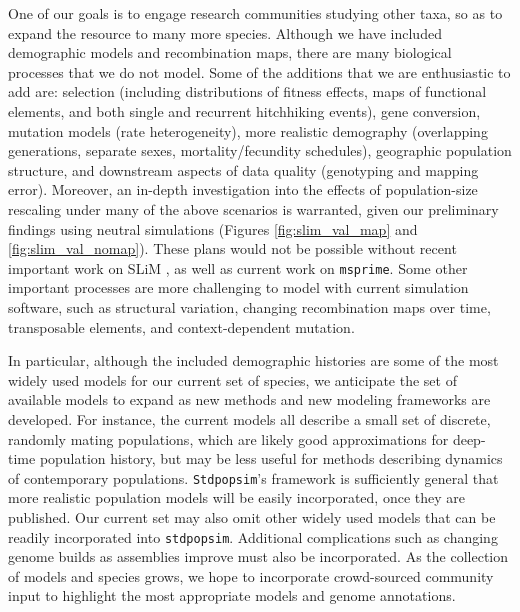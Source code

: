 \documentclass[12pt,halfline,a4paper]{ouparticle}
\newcommand{\Stdpopsim}{\texttt{Stdpopsim}\xspace}
\newcommand{\stdpopsim}{\texttt{stdpopsim}\xspace}
\begin{document}
One of our goals is to engage research communities studying other taxa,
so as to expand the resource to many more species.
Although we have included demographic models and recombination maps,
there are many biological processes that we do not model.
Some of the additions that we are enthusiastic to add are:
selection (including distributions of fitness effects, maps of functional elements, and both single and recurrent hitchhiking events),
gene conversion, mutation models (rate heterogeneity),
more realistic demography (overlapping generations, separate sexes, mortality/fecundity schedules),
geographic population structure,
and downstream aspects of data quality (genotyping and mapping error).
Moreover, an in-depth investigation into the effects of population-size rescaling under many of the
above scenarios is warranted, given our preliminary findings using neutral simulations
(Figures \ref{fig:slim_val_map} and \ref{fig:slim_val_nomap}).
These plans would not be possible without recent important work on SLiM \citep{haller2019slim},
as well as current work on \texttt{msprime}.
Some other important processes are more challenging to model with current simulation software,
such as
structural variation,
changing recombination maps over time,
transposable elements,
and context-dependent mutation.

In particular, although the included demographic histories are some of the most widely used models for our current set of species,
we anticipate the set of available models to expand
as new methods and new modeling frameworks are developed.
For instance, the current models all describe a small set of discrete, randomly mating populations,
which are likely good approximations for deep-time population history,
but may be less useful for methods describing dynamics of contemporary populations.
\Stdpopsim's framework is sufficiently general that more realistic population models
will be easily incorporated, once they are published.
Our current set may also omit other widely used models that can be readily incorporated into \stdpopsim.
Additional complications such as changing
genome builds as assemblies improve must also be incorporated.
As the collection of models and species grows, we hope to
incorporate crowd-sourced community input
to highlight the most appropriate models and genome annotations.
\end{document}
